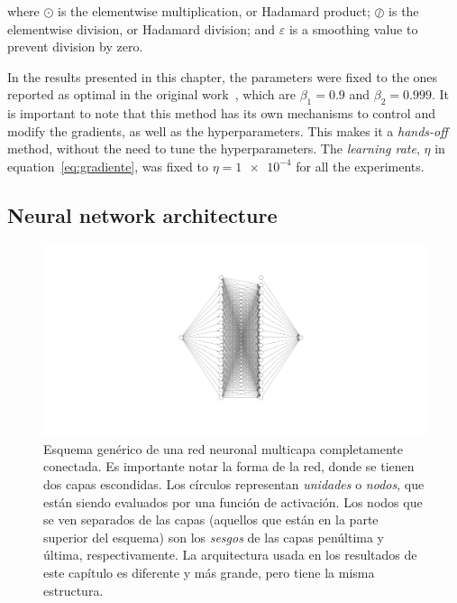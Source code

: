 where $\odot$ is the elementwise multiplication, or Hadamard product; $\oslash$
is the elementwise division, or Hadamard division; and $\varepsilon$ is a smoothing
value to prevent division by zero.

In the results presented in this chapter, the parameters were fixed to the ones reported
as optimal in the original work~\cite{kingmaAdamMethodStochastic2017}, which are
$\beta_1=\num{0.9}$ and $\beta_2=\num{0.999}$. It is important to note that this method
has its own mechanisms to control and modify the gradients, as well as the hyperparameters.
This makes it a \emph{hands-off} method, without the need to tune the hyperparameters.
The \emph{learning rate}, $\eta$ in equation~\eqref{eq:gradiente}, was fixed to
$\eta=\num{1e-4}$ for all the experiments.

\subsection{Neural network architecture}

\begin{figure}[t]
    \includegraphics[width=\textwidth]{figuras/capitulo-3/neural-network.pdf}
    \vspace{-1.5cm}
    \caption[Esquema genérico de una red neuronal.]{Esquema genérico de una red neuronal multicapa completamente conectada. Es importante notar la forma de la red, donde se tienen dos capas escondidas. Los círculos representan \emph{unidades} o \emph{nodos}, que están siendo evaluados por una función de activación. Los nodos que se ven separados de las capas (aquellos que están en la parte superior del esquema) son los \emph{sesgos} de las capas penúltima y última, respectivamente. La arquitectura usada en los resultados de este capítulo es diferente y más grande, pero tiene la misma estructura.}
    \label{fig:nn-esquema}
\end{figure}

